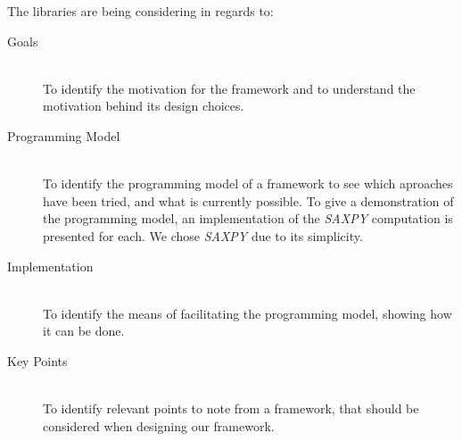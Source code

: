 The libraries are being considering in regards to:
\begin{description}
\item[Goals] \hfill \\
To identify the motivation for the framework and to understand the motivation behind its design choices.
\item[Programming Model] \hfill \\
To identify the programming model of a framework to see which aproaches have been tried, and what is currently possible. To give a demonstration of the programming model, an implementation of the \textit{SAXPY} computation is presented for each. We chose \textit{SAXPY} due to its simplicity.
\item[Implementation] \hfill \\
To identify the means of facilitating the programming model, showing how it can be done.
\item[Key Points] \hfill \\
To identify relevant points to note from a framework, that should be considered when designing our framework.
\end{description}